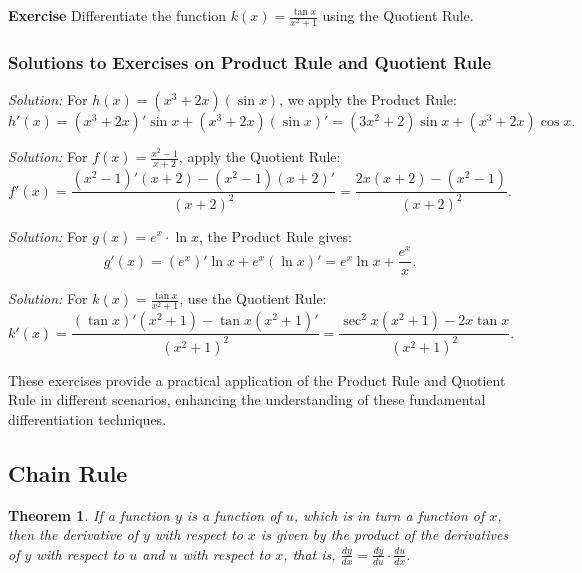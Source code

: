 \documentclass[a4paper,12pt]{book}
\newenvironment{exercise}[1][]
  {\par\medskip\noindent\textbf{Exercise #1} \rmfamily}
  {\medskip}
\newenvironment{solution}[1][]
{\par\noindent\textit{Solution:} \rmfamily}{\medskip}
\newtheorem{theorem}{Theorem}
\begin{document}
\begin{exercise}
Differentiate the function \( k(x) = \frac{\tan x}{x^2 + 1} \) using the Quotient Rule.
\end{exercise}

\subsubsection*{Solutions to Exercises on Product Rule and Quotient Rule}

\begin{solution}[to Exercise 1]
For \( h(x) = (x^3 + 2x)(\sin x) \), we apply the Product Rule:
\[ h'(x) = (x^3 + 2x)' \sin x + (x^3 + 2x) (\sin x)' = (3x^2 + 2)\sin x + (x^3 + 2x)\cos x. \]
\end{solution}

\begin{solution}[to Exercise 2]
For \( f(x) = \frac{x^2 - 1}{x + 2} \), apply the Quotient Rule:
\[ f'(x) = \frac{(x^2 - 1)'(x + 2) - (x^2 - 1)(x + 2)'}{(x + 2)^2} = \frac{2x(x + 2) - (x^2 - 1)}{(x + 2)^2}. \]
\end{solution}

\begin{solution}[to Exercise 3]
For \( g(x) = e^x \cdot \ln x \), the Product Rule gives:
\[ g'(x) = (e^x)' \ln x + e^x (\ln x)' = e^x \ln x + \frac{e^x}{x}. \]
\end{solution}

\begin{solution}[to Exercise 4]
For \( k(x) = \frac{\tan x}{x^2 + 1} \), use the Quotient Rule:
\[ k'(x) = \frac{(\tan x)'(x^2 + 1) - \tan x (x^2 + 1)'}{(x^2 + 1)^2} = \frac{\sec^2 x (x^2 + 1) - 2x \tan x}{(x^2 + 1)^2}. \]
\end{solution}

These exercises provide a practical application of the Product Rule and Quotient Rule in different scenarios, enhancing the understanding of these fundamental differentiation techniques.

\subsection{Chain Rule}

\begin{theorem}
If a function \( y \) is a function of \( u \), which is in turn a function of \( x \), then the derivative of \( y \) with respect to \( x \) is given by the product of the derivatives of \( y \) with respect to \( u \) and \( u \) with respect to \( x \), that is, \( \frac{dy}{dx} = \frac{dy}{du} \cdot \frac{du}{dx} \).
\end{theorem}
\end{document}
